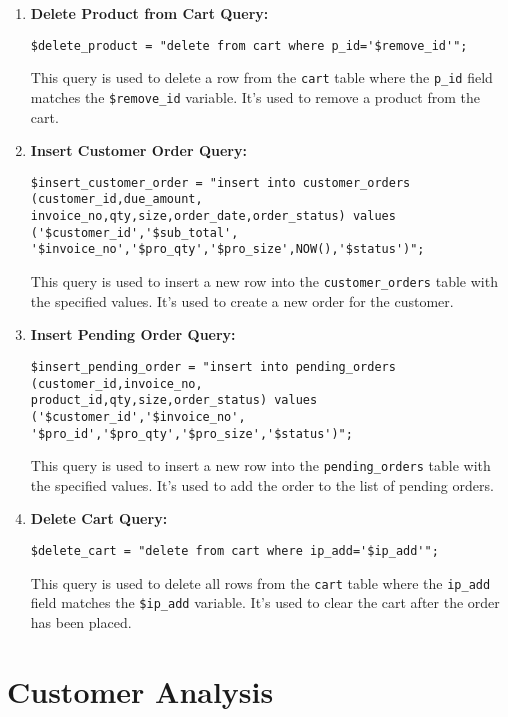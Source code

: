 \documentclass{article}
\begin{document}
\begin{enumerate}
    \item \textbf{Delete Product from Cart Query:}
    \begin{verbatim}
$delete_product = "delete from cart where p_id='$remove_id'";
    \end{verbatim}
    This query is used to delete a row from the \texttt{cart} table where the \texttt{p\_id} field matches the \texttt{\$remove\_id} variable. It's used to remove a product from the cart.
    
    \item \textbf{Insert Customer Order Query:}
    \begin{verbatim}
$insert_customer_order = "insert into customer_orders (customer_id,due_amount,
invoice_no,qty,size,order_date,order_status) values ('$customer_id','$sub_total',
'$invoice_no','$pro_qty','$pro_size',NOW(),'$status')";
    \end{verbatim}
    This query is used to insert a new row into the \texttt{customer\_orders} table with the specified values. It's used to create a new order for the customer.
    
    \item \textbf{Insert Pending Order Query:}
    \begin{verbatim}
$insert_pending_order = "insert into pending_orders (customer_id,invoice_no,
product_id,qty,size,order_status) values ('$customer_id','$invoice_no',
'$pro_id','$pro_qty','$pro_size','$status')";
    \end{verbatim}
    This query is used to insert a new row into the \texttt{pending\_orders} table with the specified values. It's used to add the order to the list of pending orders.
    
    \item \textbf{Delete Cart Query:}
    \begin{verbatim}
$delete_cart = "delete from cart where ip_add='$ip_add'";
    \end{verbatim}
    This query is used to delete all rows from the \texttt{cart} table where the \texttt{ip\_add} field matches the \texttt{\$ip\_add} variable. It's used to clear the cart after the order has been placed.
    
\end{enumerate}


\section*{Customer Analysis}

\vspace{3mm}
\end{document}

